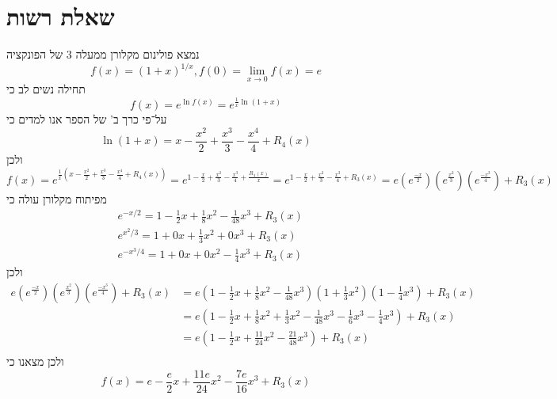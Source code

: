 \section{שאלת רשות}
נמצא פולינום מקלורן ממעלה $3$ של הפונקציה
\[
	f(x) = {(1 + x)}^{1/x}, f(0) = \lim_{x \to 0} f(x) = e
\]
תחילה נשים לב כי
\[
	f(x) = e^{\ln f(x)} = e^{\frac{1}{x} \ln(1 + x)}
\]
על־פי כרך ב' של הספר אנו למדים כי
\[
	\ln(1 + x) = x - \frac{x^2}{2} + \frac{x^3}{3} - \frac{x^4}{4} + R_4(x)
\]
ולכן
\[
	f(x) = e^{\frac{1}{x} (x - \frac{x^2}{2} + \frac{x^3}{3} - \frac{x^4}{4} + R_4(x))}
	= e^{1 - \frac{x}{2} + \frac{x^2}{3} - \frac{x^3}{4} + \frac{R_4(x)}{x}}
	= e^{1 - \frac{x}{2} + \frac{x^2}{3} - \frac{x^3}{4} + R_3(x)}
	= e(e^\frac{-x}{2})(e^\frac{x^2}{3})(e^{\frac{-x^3}{4}}) + R_3(x)
\]
מפיתוח מקלורן עולה כי
\begin{align*}
	& e^{-x/2} = 1 - \frac{1}{2} x + \frac{1}{8}x^2 - \frac{1}{48}x^3 + R_3(x) \\
	& e^{x^2/3} = 1 + 0x + \frac{1}{3}x^2 + 0 x^3 + R_3(x) \\
	& e^{-x^3/4} = 1 + 0x + 0x^2 - \frac{1}{4}x^3 + R_3(x)
\end{align*}
ולכן
\begin{align*}
	e(e^\frac{-x}{2})(e^\frac{x^2}{3})(e^{\frac{-x^3}{4}}) + R_3(x)
	& = e( 1 - \frac{1}{2} x + \frac{1}{8} x^2 - \frac{1}{48}x^3 )( 1 + \frac{1}{3} x^2 )(1 - \frac{1}{4}x^3) + R_3(x) \\
	& = e( 1 - \frac{1}{2} x + \frac{1}{8} x^2 + \frac{1}{3} x^2 - \frac{1}{48}x^3 - \frac{1}{6}x^3 - \frac{1}{4}x^3 ) + R_3(x) \\
	& = e( 1 - \frac{1}{2} x + \frac{11}{24} x^2 - \frac{21}{48}x^3 ) + R_3(x) \\
\end{align*}
ולכן מצאנו כי
\[
	f(x) = e - \frac{e}{2} x + \frac{11e}{24} x^2 - \frac{7e}{16}x^3 + R_3(x)
\]


